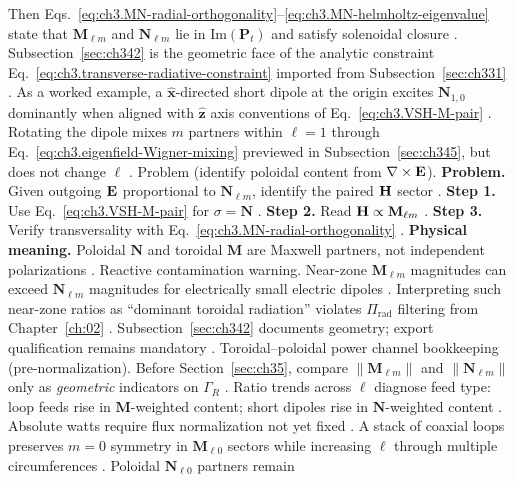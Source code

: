 Then Eqs.~\eqref{eq:ch3.MN-radial-orthogonality}--\eqref{eq:ch3.MN-helmholtz-eigenvalue} state that \(\mathbf{M}_{\ell m}\)
and \(\mathbf{N}_{\ell m}\) lie in \(\mathrm{Im}(\mathbf{P}_{t})\) and satisfy solenoidal closure
\cite{stratton1941}. Subsection~\ref{sec:ch342} is the geometric face of the analytic constraint
Eq.~\eqref{eq:ch3.transverse-radiative-constraint} imported from Subsection~\ref{sec:ch331} \cite{stratton1941}.
As a worked example, a \(\hat{\mathbf{x}}\)-directed short dipole at the origin excites \(\mathbf{N}_{1,0}\) dominantly when aligned with
\(\hat{\mathbf{z}}\) axis conventions of Eq.~\eqref{eq:ch3.VSH-M-pair} \cite{jackson1999}. Rotating the
dipole mixes \(m\) partners within \(\ell=1\) through Eq.~\eqref{eq:ch3.eigenfield-Wigner-mixing} previewed in
Subsection~\ref{sec:ch345}, but does not change \(\ell\) \cite{stratton1941}.
Problem (identify poloidal content from \(\nabla\times\mathbf{E}\)). \textbf{Problem.} Given outgoing \(\mathbf{E}\) proportional to \(\mathbf{N}_{\ell m}\), identify the paired \(\mathbf{H}\) sector
\cite{stratton1941}.
\textbf{Step 1.} Use Eq.~\eqref{eq:ch3.VSH-M-pair} for \(\sigma=\mathbf{N}\) \cite{stratton1941}.
\textbf{Step 2.} Read \(\mathbf{H}\propto\mathbf{M}_{\ell m}\) \cite{hansen1988}.
\textbf{Step 3.} Verify transversality with Eq.~\eqref{eq:ch3.MN-radial-orthogonality} \cite{tai1994}.
\textbf{Physical meaning.} Poloidal \(\mathbf{N}\) and toroidal \(\mathbf{M}\) are Maxwell partners, not independent
polarizations \cite{harrington2001}.
Reactive contamination warning. Near-zone \(\mathbf{M}_{\ell m}\) magnitudes can exceed \(\mathbf{N}_{\ell m}\) magnitudes for electrically small
electric dipoles \cite{harrington2001}. Interpreting such near-zone ratios as ``dominant toroidal radiation''
violates \(\Pi_{\mathrm{rad}}\) filtering from Chapter~\ref{ch:02} \cite{harrington2001}. Subsection~\ref{sec:ch342}
documents geometry; export qualification remains mandatory \cite{stratton1941}.
Toroidal--poloidal power channel bookkeeping (pre-normalization). Before Section~\ref{sec:ch35}, compare \(\|\mathbf{M}_{\ell m}\|\) and \(\|\mathbf{N}_{\ell m}\|\) only as
\emph{geometric} indicators on \(\Gamma_R\) \cite{hansen1988}. Ratio trends across \(\ell\) diagnose
feed type: loop feeds rise in \(\mathbf{M}\)-weighted content; short dipoles rise in \(\mathbf{N}\)-weighted content
\cite{harrington2001}. Absolute watts require flux normalization not yet fixed \cite{poynting1884}.
A stack of coaxial loops preserves \(m=0\) symmetry in \(\mathbf{M}_{\ell 0}\) sectors while increasing \(\ell\)
through multiple circumferences \cite{harrington2001}. Poloidal \(\mathbf{N}_{\ell 0}\) partners remain
